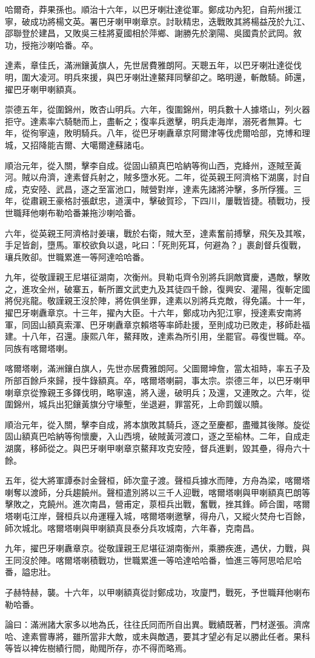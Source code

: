 \begin{pinyinscope}
哈爾奇，莽果孫也。順治十六年，以巴牙喇壯達從軍。鄭成功內犯，自荊州援江寧，破成功將楊文英。署巴牙喇甲喇章京。討耿精忠，迭戰敗其將楊益茂於九江、邵聯登於建昌，又敗吳三桂將夏國相於萍鄉、謝勝先於瀏陽、吳國貴於武岡。敘功，授拖沙喇哈番。卒。

達素，章佳氏，滿洲鑲黃旗人，先世居費雅朗阿。天聰五年，以巴牙喇壯達從伐明，圍大凌河。明兵來援，與巴牙喇壯達鰲拜同擊卻之。略明邊，斬敵騎。師還，擢巴牙喇甲喇額真。

崇德五年，從圍錦州，敗杏山明兵。六年，復圍錦州，明兵數十人據塔山，列火器拒守。達素率六騎馳而上，盡斬之；復率兵邀擊，明兵走海岸，溺死者無算。七年，從徇寧遠，敗明騎兵。八年，從巴牙喇纛章京阿爾津等伐虎爾哈部，克博和理城，又招降能吉爾、大噶爾達蘇諸屯。

順治元年，從入關，擊李自成。從固山額真巴哈納等徇山西，克絳州，逐賊至黃河。賊以舟濟，達素督兵射之，賊多墮水死。二年，從英親王阿濟格下湖廣，討自成，克安陸、武昌，逐之至富池口，賊營對岸，達素先諸將沖擊，多所俘獲。三年，從肅親王豪格討張獻忠，道漢中，擊破賀珍，下四川，屢戰皆捷。積戰功，授世職拜他喇布勒哈番兼拖沙喇哈番。

六年，從英親王阿濟格討姜瓖，戰於右衛，賊大至，達素奮前搏擊，飛矢及其喉，手足皆創，墮馬。軍校欲負以退，叱曰：「死則死耳，何避為？」裹創督兵復戰，瓖兵敗卻。世職累進一等阿達哈哈番。

九年，從敬謹親王尼堪征湖南，次衡州。貝勒屯齊令別將兵詗敵寶慶，遇敵，擊敗之，進攻全州，破寨五，斬所置文武吏九及其徒四千餘，復興安、灌陽，復斬定國將倪兆龍。敬謹親王沒於陣，將佐俱坐罪，達素以別將兵克敵，得免議。十一年，擢巴牙喇纛章京。十三年，擢內大臣。十六年，鄭成功內犯江寧，授達素安南將軍，同固山額真索渾、巴牙喇纛章京賴塔等率師赴援，至則成功已敗走，移師赴福建。十八年，召還。康熙八年，鰲拜敗，達素為所引用，坐罷官。尋復世職。卒。同族有喀爾塔喇。

喀爾塔喇，滿洲鑲白旗人，先世亦居費雅朗阿。父圖爾坤詹，當太祖時，率五子及所部百餘戶來歸，授牛錄額真。卒，喀爾塔喇嗣，事太宗。崇德三年，以巴牙喇甲喇章京從豫親王多鐸伐明，略寧遠，將入邊，破明兵；及還，又連敗之。六年，從圍錦州，城兵出犯鑲黃旗分守壕塹，坐退避，罪當死，上命罰鍰以贖。

順治元年，從入關，擊李自成，將本旗敗其騎兵，逐之至慶都，盡殲其後隊。旋從固山額真巴哈納等徇懷慶，入山西境，破賊黃河渡口，逐之至榆林。二年，自成走湖廣，移師從之。與巴牙喇甲喇章京鰲拜攻克安陸，督兵進剿，毀其壘，得舟六十餘。

五年，從大將軍譚泰討金聲桓，師次童子渡。聲桓兵據水而陣，方舟為梁，喀爾塔喇奪以渡師，分兵趨饒州。聲桓遣別將以三千人迎戰，喀爾塔喇與甲喇額真巴朗等擊敗之，克饒州。進次南昌，營甫定，葲桓兵出戰，奮戰，挫其鋒。師合圍，喀爾塔喇屯江岸，聲桓兵以舟運糧入城，喀爾塔喇邀擊，得舟八，又縱火焚舟七百餘，師次城北。喀爾塔喇與甲喇額真艮泰分兵攻城南，六年春，克南昌。

九年，擢巴牙喇纛章京。從敬謹親王尼堪征湖南衡州，乘勝疾進，遇伏，力戰，與王同沒於陣。喀爾塔喇積戰功，世職累進一等哈達哈哈番，恤進三等阿思哈尼哈番，謚忠壯。

子赫特赫，襲。十六年，以甲喇額真從討鄭成功，攻廈門，戰死，予世職拜他喇布勒哈番。

論曰：滿洲諸大家多以地為氏，往往氏同而所自出異。戰績既著，門材遂張。濟席哈、達素嘗專將，雖所當非大敵，或未與敵遇，要其才望必有足以勝此任者。果科等皆以裨佐樹績行間，勛閥所存，亦不得而略焉。


\end{pinyinscope}